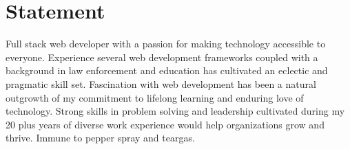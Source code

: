 \section{Statement}
Full stack web developer with a passion for making technology accessible to everyone.  Experience several web development frameworks coupled with a background in law enforcement and education has cultivated an eclectic and pragmatic skill set. Fascination with web development has been a natural outgrowth of my commitment to lifelong learning and enduring love of technology. Strong skills in problem solving and leadership cultivated during my 20 plus years of diverse work experience would help organizations grow and thrive. Immune to pepper spray and teargas. 

